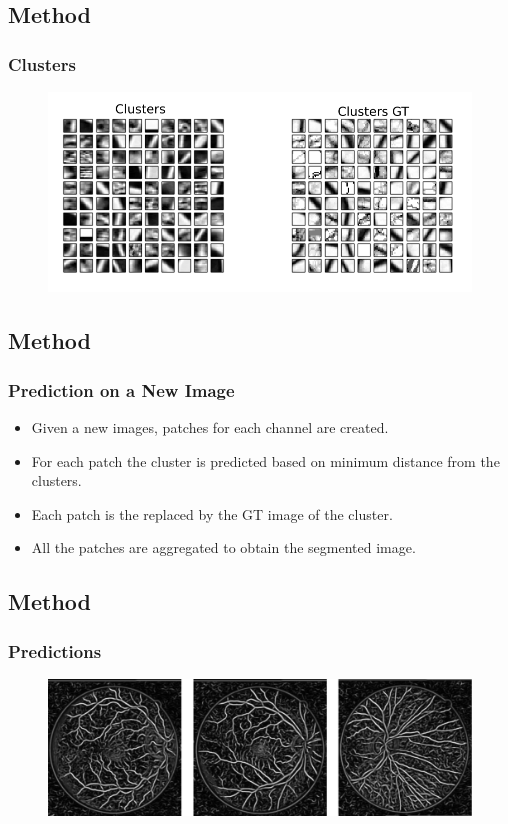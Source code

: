 \documentclass{beamer}
\begin{document}
\subsection{Method}
\begin{frame}
\frametitle{Clusters}
\begin{figure}
\includegraphics[width=1.0\linewidth]{Images/methodclus.png}

\end{figure}

\end{frame}
\subsection{Method}
\begin{frame}
\frametitle{Prediction on a New Image}
\begin{itemize}
\item Given a new images, patches for each channel are created.
\item For each patch the cluster is predicted based on minimum distance from the clusters.
\item Each patch is the replaced by the GT image of the cluster.
\item All the patches are aggregated to obtain the segmented image.
\end{itemize}

\end{frame}
\subsection{Method}
\begin{frame}
\frametitle{Predictions}
\begin{figure}
\includegraphics[width=1.0\linewidth]{Images/new.png}

\end{figure}

\end{frame}
\end{document}
